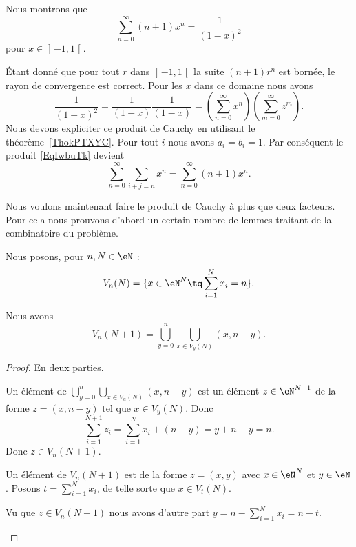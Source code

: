 \begin{example}
	Nous montrons que
	\begin{equation}
		\sum_{n=0}^{\infty}(n+1)x^n=\frac{1}{ (1-x)^2 }
	\end{equation}
	pour \( x\in\mathopen] -1 , 1 \mathclose[\).

		Étant donné que pour tout \( r\) dans \( \mathopen] -1 , 1 \mathclose[\) la suite \( (n+1)r^n\) est bornée, le rayon de convergence est correct. Pour les \( x\) dans ce domaine nous avons
	\begin{equation}        \label{EqIwbuTk}
		\frac{1}{ (1-x)^2 }=\frac{1}{ (1-x) }\frac{1}{ (1-x) }=\left( \sum_{n=0}^{\infty}x^n \right)\left( \sum_{m=0}^{\infty}z^m \right).
	\end{equation}
	Nous devons expliciter ce produit de Cauchy en utilisant le théorème~\ref{ThokPTXYC}. Pour tout \( i\) nous avons \( a_i=b_i=1\). Par conséquent le produit \eqref{EqIwbuTk} devient
	\begin{equation}
		\sum_{n=0}^{\infty}\sum_{i+j=n}x^n=\sum_{n=0}^{\infty}(n+1)x^n.
	\end{equation}
\end{example}

Nous voulons maintenant faire le produit de Cauchy à plus que deux facteurs. Pour cela nous prouvons d'abord un certain nombre de lemmes traitant de la combinatoire du problème.

Nous posons, pour \( n,N\in \eN\) :
\begin{equation}        \label{EQooJCBSooMSbaCd}
	V_n(N)=\{ x\in \eN^N\tq \sum_{i=1}^Nx_i=n \}.
\end{equation}

\begin{lemma}       \label{LEMooRKEVooDdpuHt}
	Nous avons
	\begin{equation}
		V_n(N+1)=\bigcup_{y=0}^n\bigcup_{x\in V_y(N)}(x,n-y).
	\end{equation}
\end{lemma}

\begin{proof}
	En deux parties.
	\begin{subproof}
		Un élément de \( \bigcup_{y=0}^n\bigcup_{x\in V_u(N)}(x,n-y)\) est un élément \( z\in \eN^{N+1}\) de la forme \( z=(x,n-y)\) tel que \( x\in V_y(N)\). Donc
		\begin{equation}
			\sum_{i=1}^{N+1}z_i=\sum_{i=1}^Nx_i+(n-y)=y+n-y=n.
		\end{equation}
		Donc \( z\in V_n(N+1)\).
		\begin{subproof}
			Un élément de \( V_n(N+1)\) est de la forme \( z=(x,y)\) avec \( x\in \eN^N\) et \( y\in \eN\). Posons \( t=\sum_{i=1}^Nx_i\), de telle sorte que \( x\in V_t(N)\).

			Vu que \( z\in V_n(N+1)\) nous avons d'autre part \( y=n-\sum_{i=1}^Nx_i=n-t\).
		\end{subproof}
	\end{subproof}
\end{proof}

